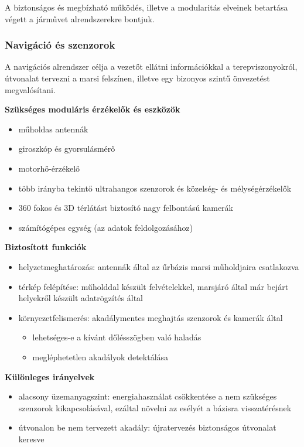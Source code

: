 \documentclass[12pt]{report}
\begin{document}
A biztonságos és megbízható működés, illetve a modularitás elveinek betartása végett a 
járművet alrendszerekre bontjuk.

\subsubsection{Navigáció és szenzorok}
A navigációs alrendszer célja a vezetőt ellátni információkkal a terepviszonyokról, útvonalat tervezni a marsi felszínen, illetve egy bizonyos szintű önvezetést megvalósítani.

\noindent\textbf{Szükséges moduláris érzékelők és eszközök}
\begin{itemize}
  \item {} műholdas antennák
  \item {} giroszkóp és gyorsulásmérő
  \item {} motorhő-érzékelő
  \item {} több irányba tekintő ultrahangos szenzorok és közelség- és mélységérzékelők
  \item {} 360 fokos és 3D térlátást biztosító nagy felbontású kamerák 
  \item {} számítógépes egység (az adatok feldolgozásához)
\end{itemize}

\noindent\textbf{Biztosított funkciók}
\begin{itemize}
  \item {} helyzetmeghatározás: antennák által az űrbázis marsi műholdjaira csatlakozva
  \item {} térkép felépítése: műholddal készült felvételekkel, marsjáró által már bejárt helyekről készült adatrögzítés által
  \item  {} környezetfelismerés: akadálymentes meghajtás szenzorok és kamerák által \begin {itemize}
      \item lehetséges-e a kívánt dőlésszögben való haladás
      \item megléphetetlen akadályok detektálása
    \end{itemize}
\end{itemize}

\noindent\textbf{Különleges irányelvek}
\begin{itemize}
  \item alacsony üzemanyagszint: energiahasználat csökkentése a nem szükséges szenzorok kikapcsolásával, ezáltal növelni az esélyét a bázisra visszatérésnek
  \item útvonalon be nem tervezett akadály: újratervezés biztonságos útvonalat keresve
\end{itemize}
\end{document}
